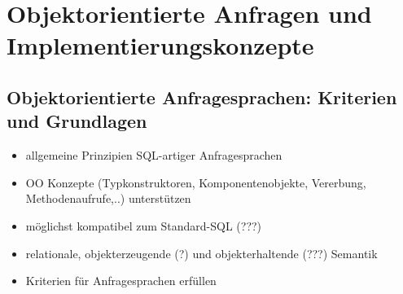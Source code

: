 \section{Objektorientierte Anfragen und Implementierungskonzepte}

\subsection{Objektorientierte Anfragesprachen: Kriterien und Grundlagen}
\begin{itemize}
	\item allgemeine Prinzipien SQL-artiger Anfragesprachen
	\item OO Konzepte (Typkonstruktoren, Komponentenobjekte, Vererbung, Methodenaufrufe,..) unterstützen
	\item möglichst kompatibel zum Standard-SQL (???)
	\item relationale, objekterzeugende (?) und objekterhaltende (???) Semantik
	\item Kriterien für Anfragesprachen erfüllen
	

\end{itemize}
